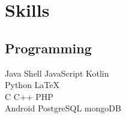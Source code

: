 \documentclass[a4paper]{deedy-resume} %
\begin{document}
\begin{minipage}[t]{0.33\textwidth}
\sectionspace %


\section{Skills}

\subsection{Programming}

Java \textbullet{} Shell \textbullet{} JavaScript \textbullet{} Kotlin \\
Python \textbullet{} \LaTeX \\ 
C \textbullet{} C++ \textbullet{} PHP \\
Android \textbullet{} PostgreSQL \textbullet{} mongoDB

\sectionspace %


\end{minipage} %
\hfill
%
%
\end{document}
